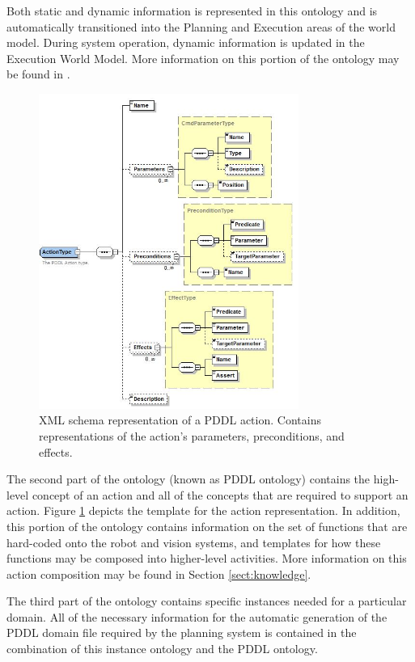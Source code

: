 Both static and dynamic information is represented in this
ontology and is automatically transitioned into the Planning and Execution areas of the world model. During system
operation,  dynamic information is updated in the Execution World Model.
More information on this portion of the ontology may be found in \cite{Balakirsky2012-1}.
%
\begin{figure}[htb!]
\begin{center}
\includegraphics[width=8.5cm]{images/ActionType.jpg}
\caption{XML schema representation of a PDDL action. Contains
representations of the action's parameters, preconditions, and effects.}
\label{fig:ActionType}
\end{center}
\end{figure}
%

The second part of the ontology (known as PDDL ontology) contains the high-level concept of an action and all of the concepts 
that are required to support an action. Figure \ref{fig:ActionType}
depicts the template for the action representation. In addition,
this portion of the ontology contains information on the set of
functions that are hard-coded onto the robot and vision systems, and
templates for how these functions may be composed into higher-level
activities. More information on this action composition may be found
in Section \ref{sect:knowledge}. 

The third part of the ontology contains specific instances needed for a particular domain. All of the necessary information for the automatic generation of the PDDL domain file required by the planning system is contained in the combination of this instance ontology and the PDDL ontology. 

